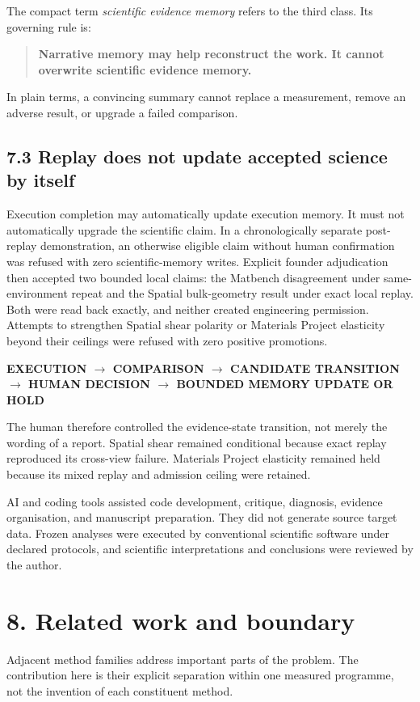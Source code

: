 \documentclass[10pt,a4paper]{article}
\begin{document}
The compact term \emph{scientific evidence memory} refers to the third class. Its governing rule is:
\begin{quote}\textbf{Narrative memory may help reconstruct the work. It cannot overwrite scientific evidence memory.}\end{quote}
In plain terms, a convincing summary cannot replace a measurement, remove an adverse result, or upgrade a failed comparison.

\subsection{7.3 Replay does not update accepted science by itself}
Execution completion may automatically update execution memory. It must not automatically upgrade the scientific claim. In a chronologically separate post-replay demonstration, an otherwise eligible claim without human confirmation was refused with zero scientific-memory writes. Explicit founder adjudication then accepted two bounded local claims: the Matbench disagreement under same-environment repeat and the Spatial bulk-geometry result under exact local replay. Both were read back exactly, and neither created engineering permission. Attempts to strengthen Spatial shear polarity or Materials Project elasticity beyond their ceilings were refused with zero positive promotions.

\begin{center}\small\bfseries
EXECUTION $\rightarrow$ COMPARISON $\rightarrow$ CANDIDATE TRANSITION $\rightarrow$ HUMAN DECISION $\rightarrow$ BOUNDED MEMORY UPDATE OR HOLD
\end{center}
The human therefore controlled the evidence-state transition, not merely the wording of a report. Spatial shear remained conditional because exact replay reproduced its cross-view failure. Materials Project elasticity remained held because its mixed replay and admission ceiling were retained.

AI and coding tools assisted code development, critique, diagnosis, evidence organisation, and manuscript preparation. They did not generate source target data. Frozen analyses were executed by conventional scientific software under declared protocols, and scientific interpretations and conclusions were reviewed by the author.

\section{8. Related work and boundary}
Adjacent method families address important parts of the problem. The contribution here is their explicit separation within one measured programme, not the invention of each constituent method.
\end{document}
